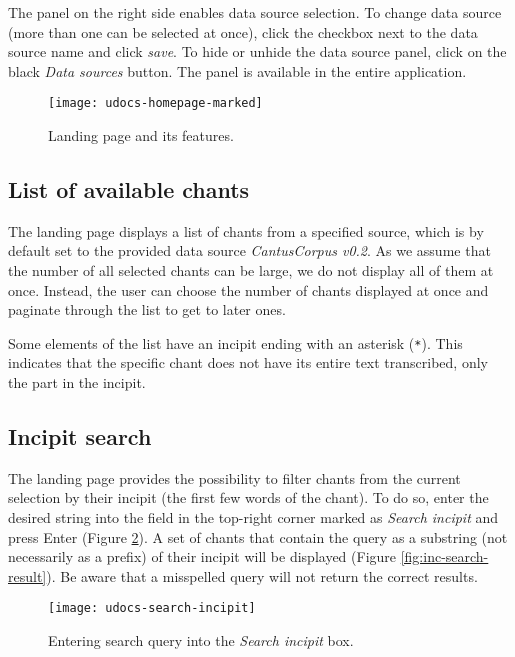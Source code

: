 The panel on the right side enables data source selection. To change data source (more than one can be selected at once), click the checkbox next
to the data source name and click \emph{save}. To hide or unhide the data source panel, click on the black \emph{Data sources} button. The panel
is available in the entire application.

\begin{figure}[!h]
\centering
\texttt{[image: udocs-homepage-marked]}
\caption{Landing page and its features.}
\label{fig:land_page}
\end{figure}

\subsection{List of available chants}

The landing page displays a list of chants from a specified source, which is by default set to the provided data source \emph{CantusCorpus v0.2}.
As we assume that the number of all selected chants can be large, we do not display all of them at once. Instead, the user can choose the number of
chants displayed at once and paginate through the list to get to later ones.

Some elements of the list have an incipit ending with an asterisk (\verb|*|). This indicates that the specific chant does not have its entire
text transcribed, only the part in the incipit.

\subsection{Incipit search}

The landing page provides the possibility to filter chants from the current selection by their incipit (the first few words of the chant). To do so, enter the desired string into
the field in the top-right corner marked as \emph{Search incipit} and press Enter (Figure \ref{fig:inc-search}). A set of chants that contain the query as
a substring (not necessarily as a prefix) of their incipit will be displayed (Figure \ref{fig:inc-search-result}). Be aware that a misspelled query will not return the correct results.

\begin{figure}[!h]
\centering
\texttt{[image: udocs-search-incipit]}
\caption{Entering search query into the \emph{Search incipit} box.}
\label{fig:inc-search}
\end{figure}

